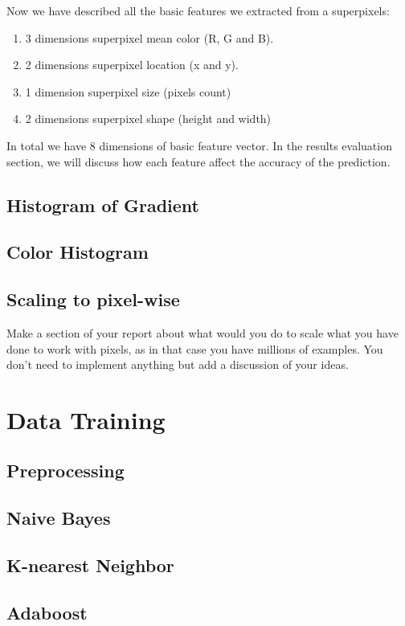 \documentclass[paper=letter, fontsize=11pt]{scrartcl}
\numberwithin{equation}{section}		%
\numberwithin{figure}{section}			%
\numberwithin{table}{section}				%
\begin{document}
Now we have described all the basic features we extracted from a superpixels:
\begin{enumerate}
	\item 3 dimensions superpixel mean color (R, G and B).
	\item 2 dimensions superpixel location (x and y).
	\item 1 dimension superpixel size (pixels count)
	\item 2 dimensions superpixel shape (height and width)
\end{enumerate}

In total we have 8 dimensions of basic feature vector. In the results evaluation section, we will discuss how each feature affect the accuracy of the prediction.





\subsection{Histogram of Gradient}
\subsection{Color Histogram}
\subsection{Scaling to pixel-wise}
Make a section of your report about what would you do to scale what you have done to work with pixels, as in that case you have millions of examples. You don't need to implement anything
but add a discussion of your ideas. 

\section{Data Training}
\subsection{Preprocessing}
\subsection{Naive Bayes}
\subsection{K-nearest Neighbor}
\subsection{Adaboost}
\end{document}
